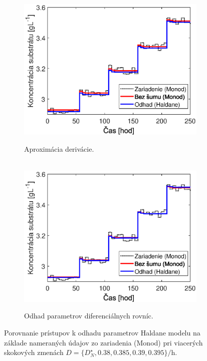 \begin{figure}
	\centering
	\begin{subfigure}[b]{0.49\textwidth}
		\centering\
		\includegraphics[width=\linewidth]{images/TwoStep_der_app_sub}
		\caption{Aproximácia derivácie.}
		\label{fig:twostep_derApp_pe}
	\end{subfigure}
	\begin{subfigure}[b]{0.49\textwidth}
		\centering\
		\includegraphics[width=\linewidth]{images/TwoStep_diff_sub}
		\caption{Odhad parametrov diferenciálnych rovníc.}
		\label{fig:twostep_diff_pe}
	\end{subfigure}
	\caption{Porovnanie prístupov k odhadu parametrov Haldane modelu na základe nameraných údajov zo zariadenia (Monod) pri viacerých skokových zmenách $ D=\lbrace D_{N}^{\star}, 0.38, 0.385, 0.39, 0.395 \rbrace \si{\per\hour} $.}
	\label{fig:twostep_pe_approach}
\end{figure}

